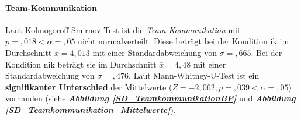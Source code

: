 \documentclass[a4paper,11pt]{article}%
\renewcommand{\\}{\vspace*{0.5\baselineskip} \newline}
\begin{document}
{\paragraph{Team-Kommunikation} 
Laut Kolmogoroff-Smirnov-Test ist die \textit{Team-Kommunikation} mit $p =,018 < \alpha = ,05$ nicht normalverteilt. 
Diese beträgt bei der Kondition \ac{ik} im Durchschnitt $\bar{x} = 4,013$ mit einer Standardabweichung von $\sigma =,665$.
Bei der Kondition \ac{nik} beträgt sie im Durchschnitt $\bar{x} = 4,48$ mit einer Standardabweichung von $\sigma =,476$. 
Laut Mann-Whitney-U-Test ist ein \textbf{signifikanter Unterschied} der Mittelwerte ($ Z = -2,062; p =,039 < \alpha = ,05$) vorhanden (siehe \textbf{\textit{Abbildung \ref{SD_TeamkommunikationBP}}} und \textbf{\textit{Abbildung \ref{SD_Teamkommunikation_Mittelwerte}}}).

}
\end{document}
